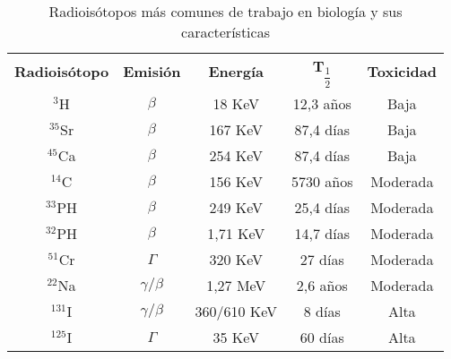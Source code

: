 \begin{table}[H]
    \centering
    \begin{tabular}{ccccc}
        \rowcolor[HTML]{000000} 
        {\color[HTML]{FFFFFF} \textbf{Radioisótopo}} &
          {\color[HTML]{FFFFFF} \textbf{Emisión}} &
          {\color[HTML]{FFFFFF} \textbf{Energía}} &
          {\color[HTML]{FFFFFF} \textbf{T$_\dfrac{1}{2}$}} &
          {\color[HTML]{FFFFFF} \textbf{Toxicidad}} \\
        $^3$H     & $\beta$                                  & 18 KeV      & 12,3 años & Baja     \\
        \rowcolor[HTML]{D9D9D9} 
        $^{35}$Sr & $\beta$                                  & 167 KeV     & 87,4 días & Baja     \\
        $^{45}$Ca & $\beta$                                  & 254 KeV     & 87,4 días & Baja     \\
        \rowcolor[HTML]{D9D9D9} 
        $^{14}$C  & $\beta$                                  & 156 KeV     & 5730 años & Moderada \\
        $^{33}$PH & $\beta$                                  & 249 KeV     & 25,4 días & Moderada \\
        \rowcolor[HTML]{D9D9D9} 
        $^{32}$PH & $\beta$                                  & 1,71 KeV    & 14,7 días & Moderada \\
        $^{51}$Cr & $\Gamma$                                 & 320 KeV     & 27 días   & Moderada \\
        \rowcolor[HTML]{D9D9D9} 
        $^{22}$Na & $\gamma / \beta$                         & 1,27 MeV    & 2,6 años  & Moderada \\
        $^{131}$I & \cellcolor[HTML]{D9D9D9}$\gamma / \beta$ & 360/610 KeV & 8 días    & Alta     \\
        \rowcolor[HTML]{D9D9D9} 
        $^{125}$I & $\Gamma$                                 & 35 KeV      & 60 días   & Alta     \\ \hline
    \end{tabular}
    \caption{Radioisótopos más comunes de trabajo en biología y sus características}
    \label{tab:Adenda:RiesgoRadio:RadioisotoposCaracteres}
\end{table}








